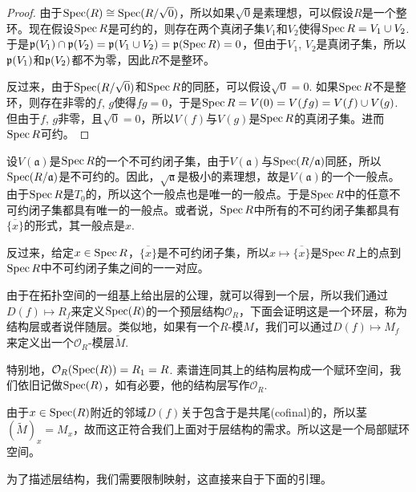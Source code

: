 \begin{proof}
由于$\operatorname{Spec}(R)\cong \operatorname{Spec}(R/\sqrt{0})$，所以如果$\sqrt{0}$是素理想，可以假设$R$是一个整环。现在假设$\operatorname{Spec} R$是可约的，则存在两个真闭子集$V_1$和$V_2$使得$\operatorname{Spec} R=V_1\cup V_2$. 于是$\mathfrak{p}(V_1)\cap \mathfrak{p}(V_2)=\mathfrak{p}(V_1\cup V_2)=\mathfrak{p} (\operatorname{Spec} R)=0$，但由于$V_1$, $V_2$是真闭子集，所以$\mathfrak{p}(V_1)$和$\mathfrak{p}(V_2)$都不为零，因此$R$不是整环。

反过来，由于$\operatorname{Spec}(R/\sqrt{0})$和$\operatorname{Spec} R$的同胚，可以假设$\sqrt{0}=0$. 如果$\operatorname{Spec} R$不是整环，则存在非零的$f$, $g$使得$fg=0$，于是$\operatorname{Spec} R=V(0)=V(fg)=V(f)\cup V(g)$. 但由于$f$, $g$非零，且$\sqrt{0}=0$，所以$V(f)$与$V(g)$是$\operatorname{Spec} R$的真闭子集。进而$\operatorname{Spec} R$可约。
\end{proof}

设$V(\mathfrak{a})$是$\operatorname{Spec} R$的一个不可约闭子集，由于$V(\mathfrak{a})$与$\operatorname{Spec} (R/\mathfrak{a})$同胚，所以$\operatorname{Spec} (R/\mathfrak{a})$是不可约的。因此，$\sqrt{\mathfrak{a}}$是极小的素理想，故是$V(\mathfrak{a})$的一个一般点。由于$\operatorname{Spec} R$是$T_0$的，所以这个一般点也是唯一的一般点。于是$\operatorname{Spec} R$中的任意不可约闭子集都具有唯一的一般点。或者说，$\operatorname{Spec} R$中所有的不可约闭子集都具有$\overline{\{x\}}$的形式，其一般点是$x$. 

反过来，给定$x\in\operatorname{Spec} R$，$\overline{\{x\}}$是不可约闭子集，所以$x\mapsto \overline{\{x\}}$是$\operatorname{Spec} R$上的点到$\operatorname{Spec} R$中不可约闭子集之间的一一对应。

\begin{para}
由于在拓扑空间的一组基上给出层的公理，就可以得到一个层，所以我们通过$D(f)\mapsto R_f$来定义$\operatorname{Spec}(R)$的一个预层结构$\mathcal{O}_R$，下面会证明这是一个环层，称为结构层或者说伴随层。类似地，如果有一个$R$-模$M$，我们可以通过$D(f)\mapsto M_f$来定义出一个$\mathcal{O}_R$-模层$\widetilde{M}$. 

特别地，$\mathcal{O}_R(\operatorname{Spec}(R))=R_1=R$. 素谱连同其上的结构层构成一个赋环空间，我们依旧记做$\operatorname{Spec}(R)$，如有必要，他的结构层写作$\mathcal{O}_R$.


由于$x\in \operatorname{Spec}(R)$附近的邻域$D(f)$关于包含于是共尾(cofinal)的，所以茎$(\widetilde{M})_x=M_x$，故而这正符合我们上面对于层结构的需求。所以这是一个局部赋环空间。
\end{para}

为了描述层结构，我们需要限制映射，这直接来自于下面的引理。

